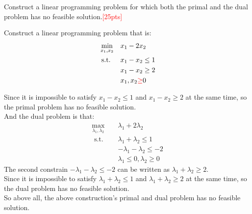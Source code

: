 \documentclass[10pt]{article}
\newenvironment{problem}[2][Problem]{\begin{trivlist}
\item[\hskip \labelsep {\bfseries #1}\hskip \labelsep {\bfseries #2.}]}{\end{trivlist}}
\begin{document}
\begin{problem}{4}
    Construct a linear programming problem for which both the primal and the dual problem has no feasible solution.\textcolor{red}{[25pts]}

Construct a linear programming problem that is:\\
\begin{equation}
\begin{aligned}
\min_{x_1,x_2} \quad & x_1-2x_2 \\
\text { s.t. } \quad & x_1 - x_2 \leq 1 \\
& x_1 - x_2 \geq 2 \\
& x_1,x_2 \textcolor{red}{\geq} 0
\end{aligned}
\end{equation}

Since it is impossible to satisfy $x_1 - x_2 \leq 1$ and $x_1 - x_2 \geq 2$ at the same time, so the primal problem has no feasible solution.\\
And the dual problem is that:\\
\begin{equation}
\begin{aligned}
\max_{\lambda_1,\lambda_2} \quad & \lambda_1 + 2\lambda_2 \\
\text { s.t. } \quad & \lambda_1 + \lambda_2 \leq 1 \\
& -\lambda_1 - \lambda_2 \leq -2 \\
& \lambda_1\leq 0,\lambda_2 \geq 0
\end{aligned}
\end{equation}
The second constrain $-\lambda_1 - \lambda_2 \leq -2$ can be written as $\lambda_1 + \lambda_2 \geq 2$.\\
Since it is impossible to satisfy $\lambda_1 + \lambda_2 \leq 1$ and $\lambda_1 + \lambda_2 \geq 2$ at the same time, so the dual problem has no feasible solution.\\

So above all, the above construction's primal and dual problem has no feasible solution.\\

\end{problem}
\end{document}
